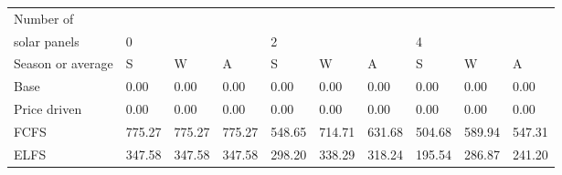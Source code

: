 \begin{table}[h] 
\centering 
\begin{tabular}{l|lll|lll|lll}Number of \\ solar panels&0& & &2& & &4& & \\ \hline 
Season or average & S & W & A & S & W & A & S & W & A \\ \hline 
Base&0.00&0.00&0.00&0.00&0.00&0.00&0.00&0.00&0.00 \\ 
Price driven&0.00&0.00&0.00&0.00&0.00&0.00&0.00&0.00&0.00 \\ 
FCFS&775.27&775.27&775.27&548.65&714.71&631.68&504.68&589.94&547.31 \\ 
ELFS&347.58&347.58&347.58&298.20&338.29&318.24&195.54&286.87&241.20 \\ 
\end{tabular} 
\end{table}